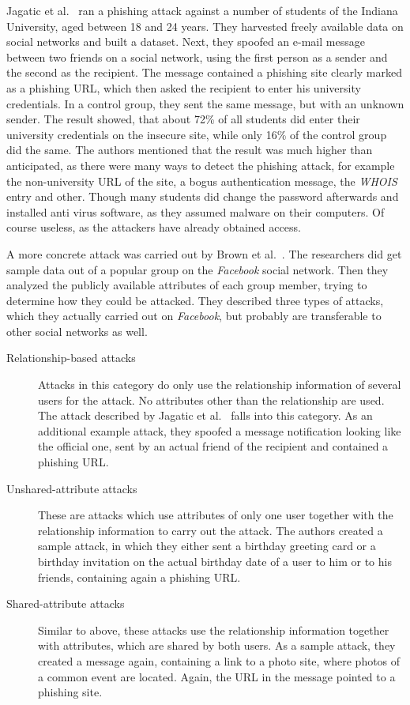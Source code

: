 Jagatic et al.~\cite{jagatic2007} ran a phishing attack against a number of
students of the Indiana University, aged between 18 and 24 years. They
harvested freely available data on social networks and built a dataset. Next,
they spoofed an e-mail message between two friends on a social network, using
the first person as a sender and the second as the recipient. The message
contained a phishing site clearly marked as a phishing URL, which then asked
the recipient to enter his university credentials. In a control group, they
sent the same message, but with an unknown sender. The result showed, that
about 72\% of all students did enter their university credentials on the
insecure site, while only 16\% of the control group did the same. The authors
mentioned that the result was much higher than anticipated, as there were many
ways to detect the phishing attack, for example the non-university URL of the
site, a bogus authentication message, the \textit{WHOIS} entry and other.
Though many students did change the password afterwards and installed anti
virus software, as they assumed malware on their computers. Of course useless,
as the attackers have already obtained access.

A more concrete attack was carried out by Brown et al.~\cite{brown2008}. The
researchers did get sample data out of a popular group on the \textit{Facebook}
social network. Then they analyzed the publicly available attributes of each
group member, trying to determine how they could be attacked. They described
three types of attacks, which they actually carried out on \textit{Facebook},
but probably are transferable to other social networks as well. 

\begin{description}
\item[Relationship-based attacks]
Attacks in this category do only use the relationship information of several
users for the attack. No attributes other than the relationship are used. The
attack described by Jagatic et al.~\cite{jagatic2007} falls into this category. As an
additional example attack, they spoofed a message notification looking like the
official one, sent by an actual friend of the recipient and contained a
phishing URL.

\item[Unshared-attribute attacks]
These are attacks which use attributes of only one user together
with the relationship information to carry out the attack. The authors created
a sample attack, in which they either sent a birthday greeting card or a
birthday invitation on the actual birthday date of a user to him or to his
friends, containing again a phishing URL.

\item[Shared-attribute attacks]
Similar to above, these attacks use the relationship information together with
attributes, which are shared by both users. As a sample attack, they created
a message again, containing a link to a photo site, where photos of a common
event are located. Again, the URL in the message pointed to a phishing site.
\end{description}

